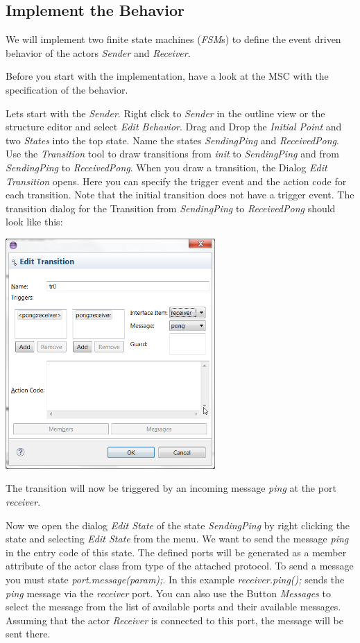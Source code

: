 \subsection{Implement the Behavior}

We will implement two finite state machines (\emph{FSM}s) to  define the event driven behavior of the actors  \emph{Sender} and \emph{Receiver}.

Before you start with the implementation, have a look at the MSC with the specification of the behavior.

Lets start with the \emph{Sender}. Right click to \emph{Sender} in the outline view or the structure editor and select \emph{Edit Behavior}.
Drag and Drop the \textit{Initial Point} and two \textit{States} into the top state. Name the states 
\textit{SendingPing} and \textit{ReceivedPong}. 
Use the \textit{Transition} tool to draw transitions from \textit{init} to \textit{SendingPing} and from \textit{SendingPing} to \textit{ReceivedPong}.
When you draw a transition, the Dialog \emph{Edit Transition} opens. Here you can specify the trigger event and the action code for each transition. Note that the initial transition does not have a trigger event.
The transition dialog for the Transition from \textit{SendingPing} to \textit{ReceivedPong} should look like this:

\includegraphics[width=0.6\textwidth]{images/017-10-Edit-Transition.png}

The transition will now be triggered by an incoming message \emph{ping} at the port \emph{receiver}.

Now we open the dialog \emph{Edit State} of the state \textit{SendingPing} by right clicking the state and selecting \emph{Edit State} from the menu.
We want to send the message \emph{ping} in the entry code of this state.
The defined ports will be generated as a member attribute of the actor class from type of the attached 
protocol. To send a message you must state \textit{port.message(param);}. In this example 
\textit{receiver.ping();} sends the \textit{ping} message via the \textit{receiver} port. You can also use the Button \emph{Messages} to select the message from the list of available ports and their available messages.
Assuming that the actor \textit{Receiver} is connected to this port, the message will be sent there.


